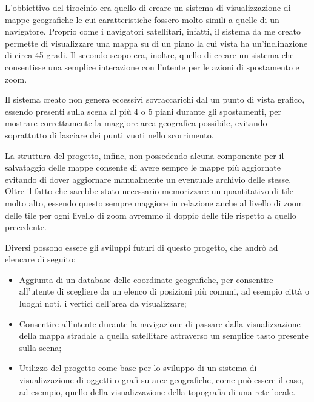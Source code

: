 L'obbiettivo del tirocinio era quello di creare un sistema di visualizzazione di mappe geografiche le cui caratteristiche fossero molto simili a quelle di un navigatore. Proprio come i navigatori satellitari, infatti, il sistema da me creato permette di visualizzare una mappa su di un piano la cui vista ha un'inclinazione di circa 45 gradi. Il secondo scopo era, inoltre, quello di creare un sistema che consentisse una semplice interazione con l'utente per le azioni di spostamento e zoom.

Il sistema creato non genera eccessivi sovraccarichi dal un punto di vista grafico, essendo presenti sulla scena al più 4 o 5 piani durante gli spostamenti, per mostrare correttamente la maggiore area geografica possibile, evitando soprattutto di lasciare dei punti vuoti nello scorrimento.

La struttura del progetto, infine, non possedendo alcuna componente per il salvataggio delle mappe consente di avere sempre le mappe più aggiornate evitando di dover aggiornare manualmente un eventuale archivio delle stesse. Oltre il fatto che sarebbe stato necessario memorizzare un quantitativo di tile molto alto, essendo questo sempre maggiore in relazione anche al livello di zoom delle tile per ogni livello di zoom avremmo il doppio delle tile rispetto a quello precedente.

Diversi possono essere gli sviluppi futuri di questo progetto, che andrò ad elencare di seguito:

\begin{itemize}
	\item Aggiunta di un database delle coordinate geografiche, per consentire all'utente di scegliere da un elenco di posizioni più comuni, ad esempio città o luoghi noti, i vertici dell'area da visualizzare;
	\item Consentire all'utente durante la navigazione di passare dalla visualizzazione della mappa stradale a quella satellitare attraverso un semplice tasto presente sulla scena;
	\item Utilizzo del progetto come base per lo sviluppo di un sistema di visualizzazione di oggetti o grafi su aree geografiche, come può essere il caso, ad esempio, quello della visualizzazione della topografia di una rete locale.
\end{itemize}